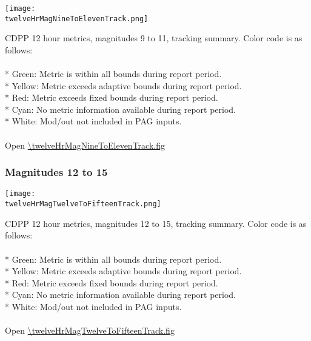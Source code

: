 \begin{center}
\texttt{[image: \\twelveHrMagNineToElevenTrack.png]}
\end{center}
CDPP 12 hour metrics, magnitudes 9 to 11, tracking summary. Color code is as follows:\\
\\
* Green: Metric is within all bounds during report period.\\
* Yellow: Metric exceeds adaptive bounds during report period.\\
* Red: Metric exceeds fixed bounds during report period.\\
* Cyan: No metric information available during report period.\\
* White: Mod/out not included in PAG inputs.\\
\\
Open \url{\twelveHrMagNineToElevenTrack.fig}

\newpage

\subsubsection{Magnitudes 12 to 15}

\begin{center}
\texttt{[image: \\twelveHrMagTwelveToFifteenTrack.png]}
\end{center}
CDPP 12 hour metrics, magnitudes 12 to 15, tracking summary. Color code is as follows:\\
\\
* Green: Metric is within all bounds during report period.\\
* Yellow: Metric exceeds adaptive bounds during report period.\\
* Red: Metric exceeds fixed bounds during report period.\\
* Cyan: No metric information available during report period.\\
* White: Mod/out not included in PAG inputs.\\
\\
Open \url{\twelveHrMagTwelveToFifteenTrack.fig}


